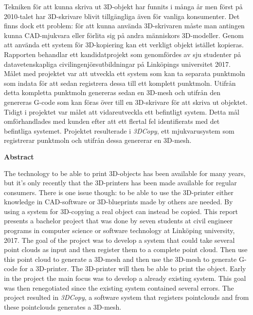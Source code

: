 \noindent
Tekniken för att kunna skriva ut 3D-objekt har funnits i många år men först på 2010-talet har 3D-skrivare blivit tillgängliga även för vanliga konsumenter. Det finns dock ett problem: för att kunna använda 3D-skrivaren måste man antingen kunna CAD-mjukvara eller förlita sig på andra människors 3D-modeller. Genom att använda ett system för 3D-kopiering kan ett verkligt objekt istället kopieras. Rapporten behandlar ett kandidatprojekt som genomfördes av sju studenter på datavetenskapliga civilingenjörsutbildningar på Linköpings universitet 2017. Målet med projektet var att utveckla ett system som kan ta separata punktmoln som indata för att sedan registrera dessa till ett komplett punktmoln. Utifrån detta kompletta punktmoln genereras sedan en 3D-mesh och utifrån den genereras G-code som kan föras över till en 3D-skrivare för att skriva ut objektet. Tidigt i projektet var målet att vidareutveckla ett befintligt system. Detta mål omförhandlades med kunden efter att ett flertal fel identifierats med det befintliga systemet. Projektet resulterade i \textit{3DCopy}, ett mjukvarusystem som registrerar punktmoln och utifrån dessa genererar en 3D-mesh.
\bigskip

\begin{center}
\textbf{Abstract}
\end{center}
\noindent

The technology to be able to print 3D-objects has been available for many years, but it's only recently that the 3D-printers has been made available for regular consumers. There is one issue though: to be able to use the 3D-printer either knowledge in CAD-software or 3D-blueprints made by others are needed. By using a system for 3D-copying a real object can instead be copied. This report presents a bachelor project that was done by seven students at civil engineer programs in computer science or software technology at Linköping university, 2017. The goal of the project was to develop a system that could take several point clouds as input and then register them to a complete point cloud. Then use this point cloud to generate a 3D-mesh and then use the 3D-mesh to generate G-code for a 3D-printer. The 3D-printer will then be able to print the object. Early in the project the main focus was to develop a already existing system. This goal was then renegotiated since the existing system contained several errors. The project resulted in \textit{3DCopy}, a software system that registers pointclouds and from these pointclouds generates a 3D-mesh.

